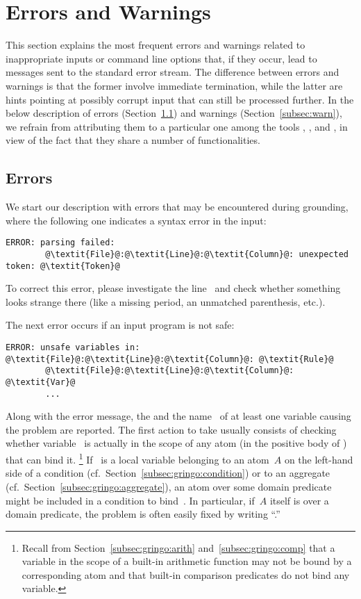 \section{Errors and Warnings}\label{sec:error:warn}

This section explains the most frequent errors and warnings
related to inappropriate inputs or command line options that,
if they occur, lead to messages sent to the standard error stream.
The difference between errors and warnings is that the former
involve immediate termination,
while the latter are hints pointing at possibly corrupt input
that can still be processed further.
In the below description of errors (Section~\ref{subsec:error})
and warnings (Section~\ref{subsec:warn}),
we refrain from attributing them to a particular one among the tools
\gringo, \clasp, and \clingo,
in view of the fact that they share a number of functionalities.


\subsection{Errors}\label{subsec:error}

We start our description with errors that may be encountered during grounding,
where the following one indicates a syntax error in the input:
%
\begin{lstlisting}[numbers=none,escapechar=@]
ERROR: parsing failed:
        @\textit{File}@:@\textit{Line}@:@\textit{Column}@: unexpected token: @\textit{Token}@
\end{lstlisting}
%
To correct this error, please investigate the line~
and check whether something looks strange there
(like a missing period, an unmatched parenthesis, etc.).

The next error occurs if an input program is not safe:
%
\begin{lstlisting}[numbers=none,escapechar=@]
ERROR: unsafe variables in:
@\textit{File}@:@\textit{Line}@:@\textit{Column}@: @\textit{Rule}@
        @\textit{File}@:@\textit{Line}@:@\textit{Column}@: @\textit{Var}@
        ...
\end{lstlisting}
%
Along with the error message, the  and the
name~ of at least one variable causing the problem
are reported.
The first action to take usually consists of checking whether
variable~ is actually in the scope of any atom
(in the positive body of ) that can bind it.%
\footnote{%
  Recall from Section~\ref{subsec:gringo:arith} and~\ref{subsec:gringo:comp}
  that a variable in the scope of a built-in arithmetic function may not be bound
  by a corresponding atom and that built-in comparison predicates do not bind
  any variable.}
If~ is a local variable belonging to an atom~$A$ 
on the left-hand side of a condition (cf.\ Section~\ref{subsec:gringo:condition})
or to an aggregate (cf.\ Section~\ref{subsec:gringo:aggregate}),
an atom over some domain predicate might be included in a condition
to bind~.
In particular, if~$A$ itself is over a domain predicate,
the problem is often easily fixed by writing ``.''


